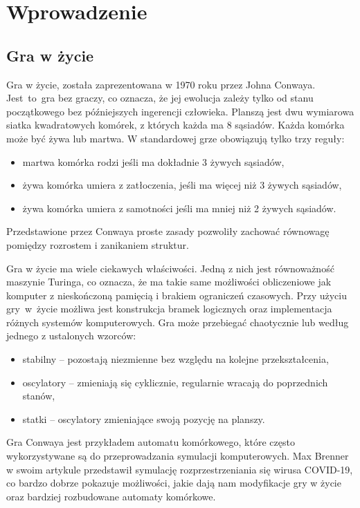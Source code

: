 \documentclass[declaration,shortabstract, inz]{iithesis}
\author         {Marcin Rogala}
\date          {25 grudnia 2020}
\theoremstyle{definition} \newtheorem{definition}{Definicja}[]
\theoremstyle{plain} \newtheorem{remark}[definition]{Obserwacja}
\theoremstyle{plain} \newtheorem{theorem}[definition]{Twierdzenie}
\theoremstyle{plain} \newtheorem{example}{Przykład}[definition]
\theoremstyle{plain} \newtheorem{lemma}[definition]{Lemat}
\begin{document}
\chapter{Wprowadzenie}
\section{Gra w życie}
Gra w życie, została zaprezentowana w 1970 roku przez Johna Conwaya.  Jest~to~gra bez graczy, co oznacza, że jej ewolucja zależy tylko od stanu początkowego bez późniejszych ingerencji człowieka. Planszą jest dwu wymiarowa siatka kwadratowych komórek, z których każda ma 8 sąsiadów. Każda komórka może być żywa lub martwa. W standardowej grze obowiązują tylko trzy reguły:

\begin{itemize}
\item martwa komórka rodzi jeśli ma dokładnie 3 żywych sąsiadów,
\item żywa komórka umiera z zatłoczenia, jeśli ma więcej niż 3 żywych sąsiadów,
\item żywa komórka umiera z samotności jeśli ma mniej niż 2 żywych sąsiadów.
\end{itemize}

Przedstawione przez Conwaya proste zasady pozwoliły zachować równowagę pomiędzy rozrostem i zanikaniem struktur.

Gra w życie ma wiele ciekawych właściwości. Jedną z nich jest równoważność maszynie Turinga, co oznacza, że ma takie same możliwości obliczeniowe jak komputer z nieskończoną pamięcią i brakiem ograniczeń czasowych. Przy użyciu gry~w~życie możliwa jest konstrukcja bramek logicznych oraz implementacja różnych systemów komputerowych. Gra może przebiegać chaotycznie lub według jednego z ustalonych wzorców: 
\begin{itemize}
	\item stabilny -- pozostają niezmienne bez względu na kolejne przekształcenia,
	\item oscylatory -- zmieniają się cyklicznie, regularnie wracają do poprzednich stanów,
	\item statki -- oscylatory zmieniające swoją pozycję na planszy.
\end{itemize}

Gra Conwaya jest przykładem automatu komórkowego, które często wykorzystywane są do przeprowadzania symulacji komputerowych. 
Max Brenner w swoim artykule \cite{brenner} przedstawił symulację rozprzestrzeniania się wirusa COVID-19, co bardzo dobrze pokazuje możliwości, jakie dają nam modyfikacje gry w życie oraz bardziej rozbudowane automaty komórkowe.
\end{document}
